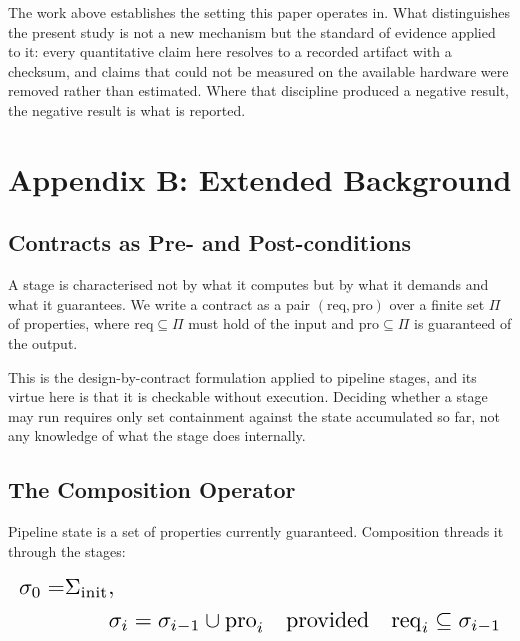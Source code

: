 \documentclass[10pt,twocolumn,letterpaper]{article}
\begin{document}
The work above establishes the setting this paper operates in. What distinguishes the present study is not a new mechanism but the standard of evidence applied to it: every quantitative claim here resolves to a recorded artifact with a checksum, and claims that could not be measured on the available hardware were removed rather than estimated. Where that discipline produced a negative result, the negative result is what is reported.




\section{Appendix B: Extended Background}



\subsection{Contracts as Pre- and Post-conditions}


A stage is characterised not by what it computes but by what it demands and what it guarantees. We write a contract as a pair $(\mathrm{req}, \mathrm{pro})$ over a finite set $\Pi$ of properties, where $\mathrm{req} \subseteq \Pi$ must hold of the input and $\mathrm{pro} \subseteq \Pi$ is guaranteed of the output.

This is the design-by-contract formulation applied to pipeline stages, and its virtue here is that it is checkable without execution. Deciding whether a stage may run requires only set containment against the state accumulated so far, not any knowledge of what the stage does internally.


\subsection{The Composition Operator}


Pipeline state is a set of properties currently guaranteed. Composition threads it through the stages:




\begin{equation}
\resizebox{\columnwidth}{!}{$\displaystyle
\begin{aligned}
\sigma_0 = & \Sigma_{\text{init}}, \\
& \qquad
\sigma_{i} = \sigma_{i-1} \cup \mathrm{pro}_i \quad \text{provided} \quad \mathrm{req}_i \subseteq \sigma_{i-1}
\end{aligned}
$}
\end{equation}
\end{document}
